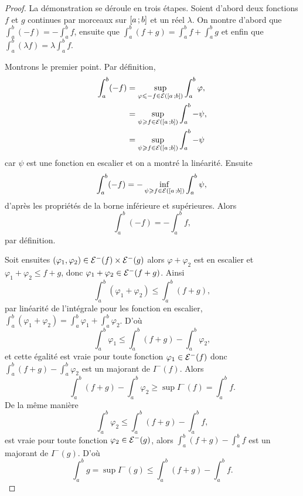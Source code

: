 \begin{proof}
  La démonstration se déroule en trois étapes. Soient d'abord deux fonctions \(f\) et \(g\) continues par morceaux sur \(\left[ a \, ;  b \right]\) et un réel \(\lambda\). On montre d'abord que \(\int_a^b (-f) = -\int_a^b f\), ensuite que \(\int_a^b (f+g) = \int_a^b f + \int_a^b g\) et enfin que \(\int_a^b (\lambda f) = \lambda \int_a^b f\).

Montrons le premier point. Par définition,
\begin{align}
  \int_a^b (-f) &= \sup\limits_{\varphi \leqslant -f \in \mathcal{E}(\left[ a \, ;  b \right])} \int_a^b \varphi ,\\
  &= \sup\limits_{\psi \geqslant f \in \mathcal{E}(\left[ a \, ;  b \right])} \int_a^b -\psi ,\\
  &= \sup\limits_{\psi \geqslant f \in \mathcal{E}(\left[ a \, ;  b \right])} \int_a^b -\psi 
\end{align}
car \(\psi\) est une fonction en escalier et on a montré la linéarité. Ensuite
\begin{equation}
  \int_a^b (-f) = -\inf\limits_{\psi \geqslant f \in \mathcal{E}(\left[ a \, ;  b \right])} \int_a^b \psi ,\\
\end{equation}
d'après les propriétés de la borne inférieure et supérieures. Alors
\begin{equation}
   \int_a^b (-f) = -\int_a^b f,
\end{equation}
par définition.

Soit ensuites \((\varphi_1, \varphi_2) \in \mathcal{E}^{-}(f) \times \mathcal{E}^{-}(g)\) alors \(\varphi+\varphi_2\) est en escalier et \(\varphi_1+\varphi_2 \leqslant f+g\), donc \(\varphi_1+\varphi_2 \in \mathcal{E}^{-}(f+g)\). Ainsi
\begin{equation}
  \int_a^b (\varphi_1+\varphi_2) \leqslant \int_a^b (f+g),
\end{equation}
par linéarité de l'intégrale pour les fonction en escalier, \(\int_a^b (\varphi_1+\varphi_2) = \int_a^b \varphi_1 + \int_a^b \varphi_2\). D'où
\begin{equation}
  \int_a^b \varphi_1 \leqslant \int_a^b (f+g) - \int_a^b \varphi_2,
\end{equation}
et cette égalité est vraie pour toute fonction \(\varphi_1 \in \mathcal{E}^{-}(f)\) donc \(\int_a^b (f+g) - \int_a^b \varphi_2\) est un majorant de \(I^{-}(f)\). Alors
\begin{equation}
  \int_a^b (f+g) - \int_a^b \varphi_2 \geqslant \sup I^{-}(f) = \int_a^b f.
\end{equation}
De la même manière
\begin{equation}
  \int_a^b \varphi_2 \leqslant \int_a^b (f+g) - \int_a^b f,
\end{equation}
est vraie pour toute fonction \(\varphi_2 \in \mathcal{E}^{-}(g)\), alors \(\int_a^b (f+g) - \int_a^b f\) est un majorant de \(I^{-}(g)\). D'où
\begin{equation}
  \int_a^b g = \sup I^{-}(g) \leqslant \int_a^b (f+g) - \int_a^b f.
\end{equation}


\end{proof}
